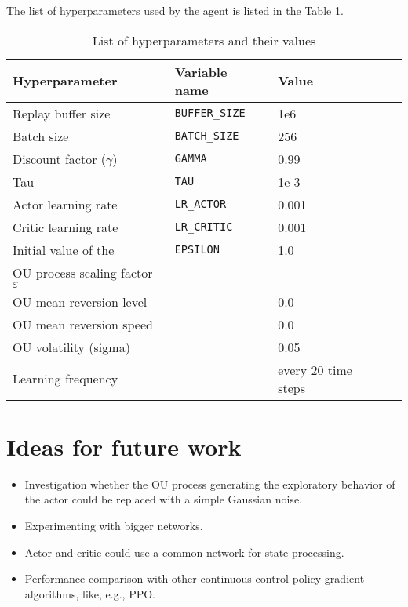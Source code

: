 \documentclass[a4paper,12pt]{amsart}
\begin{document}


The list of hyperparameters used by the agent is listed in the Table \ref{tab:hyperparameters}.

\begin{table}
\caption{List of hyperparameters and their values}
\begin{tabular}{|l|l|l|l|}
    \hline
Hyperparameter & Variable name & Value \\ 
    \hline \hline
    Replay buffer size & \texttt{BUFFER\_SIZE} &  1e6 \\ \hline
    Batch size & \texttt{BATCH\_SIZE} &  256  \\  \hline
    Discount factor ($\gamma$) & \texttt{GAMMA} &  0.99 \\ \hline
    Tau & \texttt{TAU} & 1e-3 \\ \hline
    Actor learning rate & \texttt{LR\_ACTOR} & 0.001 \\ \hline
    Critic learning rate & \texttt{LR\_CRITIC} & 0.001 \\ \hline
    Initial value of the & \texttt{EPSILON} & 1.0 \\
    OU process scaling factor $\varepsilon$ && \\ \hline
    OU mean reversion level & & 0.0 \\ \hline
    OU mean reversion speed & & 0.0 \\ \hline
    OU volatility (sigma) & & 0.05 \\ \hline
    Learning frequency & \texttt{} &  every 20 time steps \\ \hline
\end{tabular}
\label{tab:hyperparameters}
\end{table}


\section{Ideas for future work}



\begin{itemize}
    \item Investigation whether the OU process generating the exploratory
        behavior of the actor could be replaced with a simple Gaussian noise.
    \item Experimenting with bigger networks.
    \item Actor and critic could use a common network for state processing. 
    \item Performance comparison with other continuous control policy gradient algorithms,
        like, e.g., PPO.
\end{itemize}




\nocite{Cinlar2011}
\nocite{lillicrap2015continuous}
\printbibliography
\end{document}

